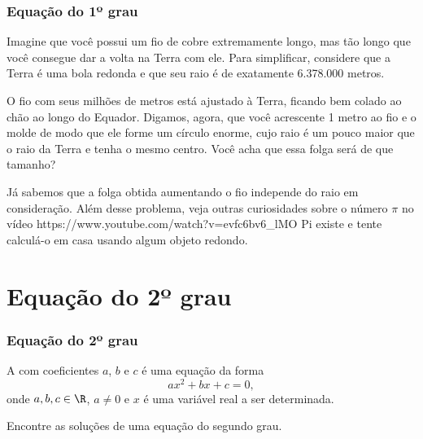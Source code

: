 \documentclass[brazil, notheorems, 10pt]{beamer}
\begin{document}
\begin{frame}
\frametitle{Equação do 1º grau} %

\begin{Exem}
Imagine que você possui um fio de cobre extremamente longo, mas tão
longo que você consegue dar a volta na Terra com ele. Para
simplificar, considere que a Terra é uma bola redonda e que seu raio
é de exatamente 6.378.000 metros.

O fio com seus milhões de metros está ajustado à Terra, ficando bem
colado ao chão ao longo do Equador. Digamos, agora, que você
acrescente 1 metro ao fio e o molde de modo que ele forme um círculo
enorme, cujo raio é um pouco maior que o raio da Terra e tenha o
mesmo centro. Você acha que essa folga será de que tamanho?
\end{Exem}

\pause Já sabemos que a folga obtida aumentando o fio independe do
raio em consideração. Além desse problema, veja outras curiosidades
sobre o número $\pi$ no vídeo \link
{https://www.youtube.com/watch?v=evfc6bv6_lM}{O Pi existe} e tente
calculá-o em casa usando algum objeto redondo.


\end{frame}

\section{Equação do 2º grau}
\begin{frame}
\frametitle{Equação do 2º grau} %

\begin{Def}
A  com coeficientes $a$, $b$ e $c$ é
uma equação da forma $$ax^2 + bx + c = 0,$$ onde $a, b, c \in \R$,
$a \neq 0$ e $x$ é uma variável real a ser determinada.
\end{Def}

\begin{Exem}
Encontre as soluções de uma equação do segundo grau.
\end{Exem}

\end{frame}

\end{document}
